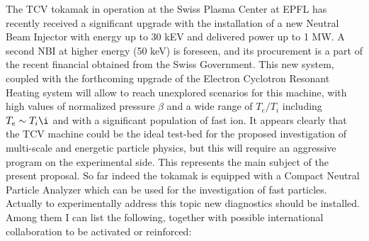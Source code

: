 \documentclass[12pt,a4paper]{article}
\begin{document}
The TCV tokamak in operation at the Swiss Plasma Center at EPFL has 
recently received a significant upgrade with the installation of a new Neutral Beam
Injector with energy up to 30 kEV and delivered power up to 1 MW. A
second NBI at higher energy (50 keV) is foreseen, and its procurement
is a part of the recent financial obtained from the Swiss Government. This
new system, coupled with the forthcoming upgrade of the Electron
Cyclotron Resonant Heating system will allow to reach unexplored
scenarios for this machine, with high values of normalized pressure $\beta$ and a wide range of
$T_e/T_i$ including $T_e\sim T_i\i$ and with a significant population
of fast ion. It appears clearly that the TCV machine could be the
ideal test-bed for the proposed investigation of multi-scale and
energetic particle physics, but this will require an aggressive
program on the 
experimental side. This represents the main subject of the present proposal. 
So far indeed the tokamak is equipped with a
Compact Neutral Particle Analyzer which can be used for the
investigation of fast particles. Actually to experimentally address
this topic new diagnostics should be installed. Among them I can list the
following, together with possible international collaboration to be activated or reinforced:
\end{document}
